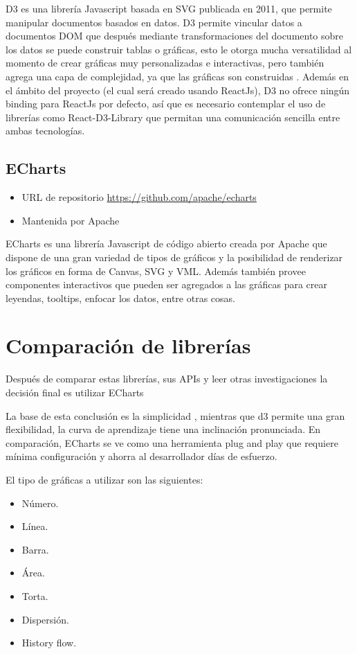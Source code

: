 D3 es una librería Javascript basada en SVG publicada en 2011, que permite manipular documentos basados en datos. D3 permite vincular datos a documentos DOM que después mediante transformaciones del documento sobre los datos se puede construir tablas o gráficas, esto le otorga mucha versatilidad al momento de crear gráficas muy personalizadas e interactivas, pero también agrega una capa de complejidad, ya que las gráficas son construidas . Además en el ámbito del proyecto (el cual será creado usando ReactJs), D3 no ofrece ningún binding para ReactJs por defecto, así que es necesario contemplar el uso de librerías como React-D3-Library\cite{ReactD3Library} que permitan una comunicación sencilla entre ambas tecnologías. 

\subsection{ ECharts }
\begin{itemize}
    \item URL de repositorio \href{https://github.com/apache/echarts}{https://github.com/apache/echarts}
    \item Mantenida por Apache
\end{itemize}

ECharts es una librería Javascript de código abierto creada por Apache que dispone de una gran variedad de tipos de gráficos y la posibilidad de renderizar los gráficos en forma de Canvas, SVG y VML. Además también provee componentes interactivos  que pueden ser agregados a las gráficas para crear leyendas, tooltips, enfocar los datos, entre otras cosas.

\section{ Comparación de librerías }

Después de comparar estas librerías, sus APIs y leer otras investigaciones la decisión final es utilizar ECharts

La base de esta conclusión es la simplicidad \cite{EchartsDecision}, mientras que d3 permite una gran flexibilidad, la curva de aprendizaje tiene una inclinación pronunciada. 
En comparación, ECharts se ve como una herramienta plug and play que requiere mínima configuración y ahorra al desarrollador días de esfuerzo.

El tipo de gráficas a utilizar son las siguientes:
\begin{itemize}    
    \item Número.
    \item Línea.
    \item Barra.
    \item Área.
    \item Torta.
    \item Dispersión.
    \item History flow.
\end{itemize}

